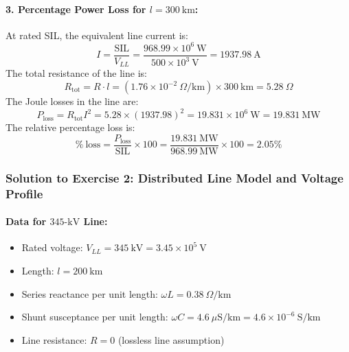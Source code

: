 \paragraph{3. Percentage Power Loss for $l = 300\ \text{km}$:}
At rated SIL, the equivalent line current is:
\begin{equation}
    I = \frac{\text{SIL}}{V_{LL}} = \frac{968.99 \times 10^6\ \text{W}}{500 \times 10^3\ \text{V}} = 1937.98\ \text{A}
\end{equation}
The total resistance of the line is:
\begin{equation}
    R_{\text{tot}} = R \cdot l = (1.76 \times 10^{-2}\ \Omega/\text{km}) \times 300\ \text{km} = 5.28\ \Omega
\end{equation}
The Joule losses in the line are:
\begin{equation}
    P_{\text{loss}} = R_{\text{tot}} I^2 = 5.28 \times (1937.98)^2 = 19.831 \times 10^6\ \text{W} = 19.831\ \text{MW}
\end{equation}
The relative percentage loss is:
\begin{equation}
    \boxed{\%\ \text{loss} = \frac{P_{\text{loss}}}{\text{SIL}} \times 100 = \frac{19.831\ \text{MW}}{968.99\ \text{MW}} \times 100 = 2.05\%}
\end{equation}

\subsubsection*{Solution to Exercise 2: Distributed Line Model and Voltage Profile}
\paragraph{Data for $345\text{-kV}$ Line:}
\begin{itemize}
    \item Rated voltage: $V_{LL} = 345\ \text{kV} = 3.45 \times 10^5\ \text{V}$
    \item Length: $l = 200\ \text{km}$
    \item Series reactance per unit length: $\omega L = 0.38\ \Omega/\text{km}$
    \item Shunt susceptance per unit length: $\omega C = 4.6\ \mu\text{S/km} = 4.6 \times 10^{-6}\ \text{S/km}$
    \item Line resistance: $R = 0$ (lossless line assumption)
\end{itemize}

